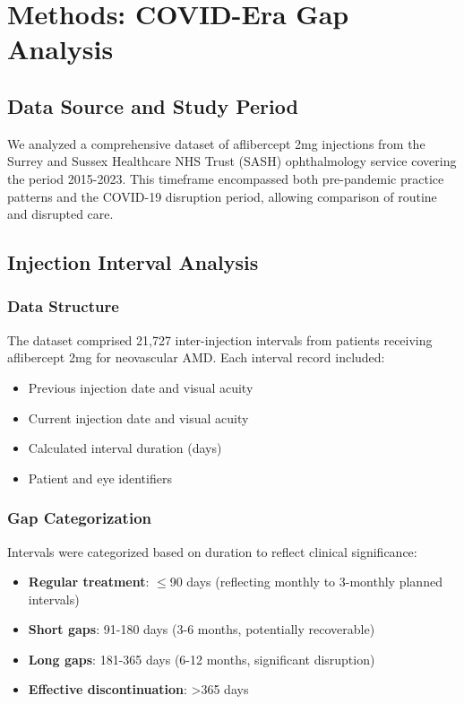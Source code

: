 \section{Methods: COVID-Era Gap Analysis}

\subsection{Data Source and Study Period}

We analyzed a comprehensive dataset of aflibercept 2mg injections from the Surrey and Sussex Healthcare NHS Trust (SASH) ophthalmology service covering the period 2015-2023. This timeframe encompassed both pre-pandemic practice patterns and the COVID-19 disruption period, allowing comparison of routine and disrupted care.

\subsection{Injection Interval Analysis}

\subsubsection{Data Structure}
The dataset comprised 21,727 inter-injection intervals from patients receiving aflibercept 2mg for neovascular AMD. Each interval record included:
\begin{itemize}
    \item Previous injection date and visual acuity
    \item Current injection date and visual acuity
    \item Calculated interval duration (days)
    \item Patient and eye identifiers
\end{itemize}

\subsubsection{Gap Categorization}
Intervals were categorized based on duration to reflect clinical significance:
\begin{itemize}
    \item \textbf{Regular treatment}: $\leq$90 days (reflecting monthly to 3-monthly planned intervals)
    \item \textbf{Short gaps}: 91-180 days (3-6 months, potentially recoverable)
    \item \textbf{Long gaps}: 181-365 days (6-12 months, significant disruption)
    \item \textbf{Effective discontinuation}: >365 days
\end{itemize}

